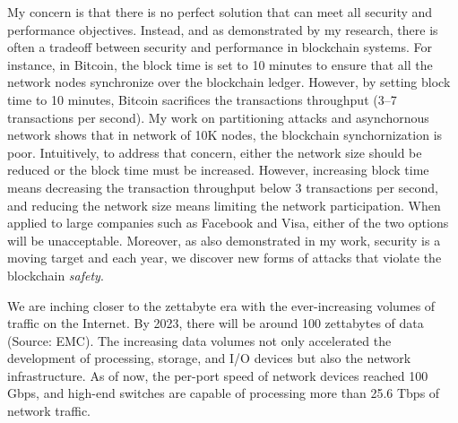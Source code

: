 \documentclass{NSF}
\begin{document}
My concern is that there is no perfect solution that can meet all security and performance objectives. Instead, and as demonstrated by my research, there is often a tradeoff between security and performance in blockchain systems. For instance, in Bitcoin, the block time is set to 10 minutes to ensure that all the network nodes synchronize over the blockchain ledger. However, by setting block time to 10 minutes, Bitcoin sacrifices the transactions throughput (3--7 transactions per second). My work on partitioning attacks and asynchornous network shows that in network of 10K nodes, the blockchain synchornization is poor. Intuitively, to address that concern, either the network size should be reduced or the block time must be increased. However, increasing block time means decreasing the transaction throughput below 3 transactions per second, and reducing the network size means limiting the network participation. When applied to large companies such as Facebook and Visa, either of the two options will be unacceptable. Moreover, as also demonstrated in my work, security is a moving target and each year, we discover new forms of attacks that violate the blockchain {\em safety}. 






We are inching closer to the zettabyte era with the ever-increasing volumes of traffic on the Internet. 
By 2023, there will be around 100 zettabytes of data (Source: EMC). 
The increasing data volumes not only accelerated the development of processing, storage, and I/O devices but also the network infrastructure. As of now, the per-port speed of network devices reached 100 Gbps, and high-end switches are capable of processing more than 25.6 Tbps of network traffic. 
\end{document}
